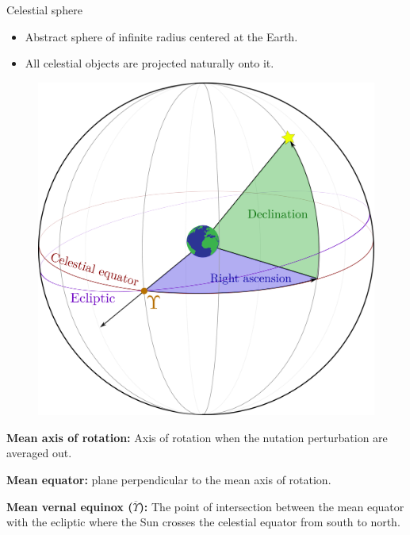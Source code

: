 \documentclass{beamer} %
\begin{document}
\begin{frame}{Celestial sphere}
  \begin{itemize}
    \item Abstract sphere of infinite radius centered at the Earth.
    \item All celestial objects are projected naturally onto it.
  \end{itemize}
  \begin{minipage}{0.45\textwidth}
    \begin{figure}
      \centering
      \includegraphics[width=\textwidth]{../Images/right_ascension-decli.pdf}
    \end{figure}
  \end{minipage}\hfill
  \begin{minipage}{0.5\textwidth}
    \textbf{Mean axis of rotation:} Axis of rotation when the nutation perturbation are averaged out.

    \textbf{Mean equator:} plane perpendicular to the mean axis of rotation.

    \textbf{Mean vernal equinox ($\overline{\Upsilon}$):} The point of intersection between the mean equator with the ecliptic where the Sun crosses the celestial equator from south to north.
  \end{minipage}
\end{frame}
\end{document}
